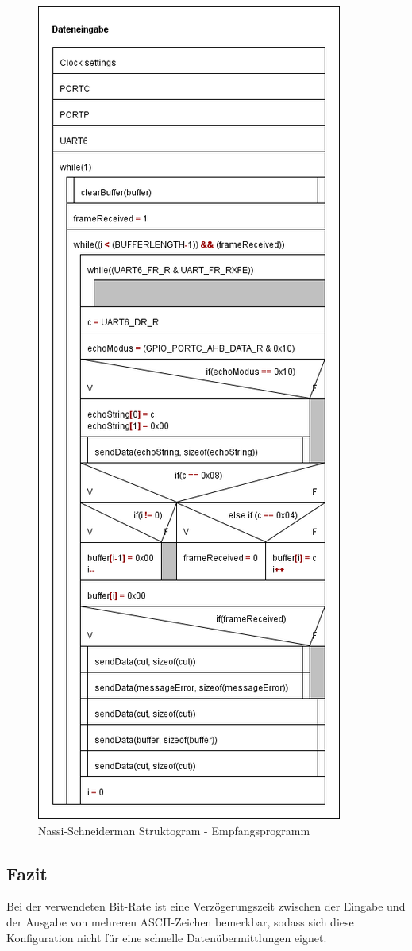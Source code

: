 		\begin{figure}[H]
		\centering
		\includegraphics[width=0.5\linewidth]{../Bilder/Struktogramm_Dateneingabe}
		\caption{Nassi-Schneiderman Struktogram - Empfangsprogramm}
		\label{fig:Struktogramm_Dateneingabe}
		\end{figure}

	\newpage

		
	
	\subsection{Fazit}
	Bei der verwendeten Bit-Rate ist eine Verzögerungszeit zwischen der Eingabe und der Ausgabe von mehreren ASCII-Zeichen bemerkbar, sodass sich diese Konfiguration nicht für eine schnelle Datenübermittlungen eignet.
	
	
	{}
	
	

